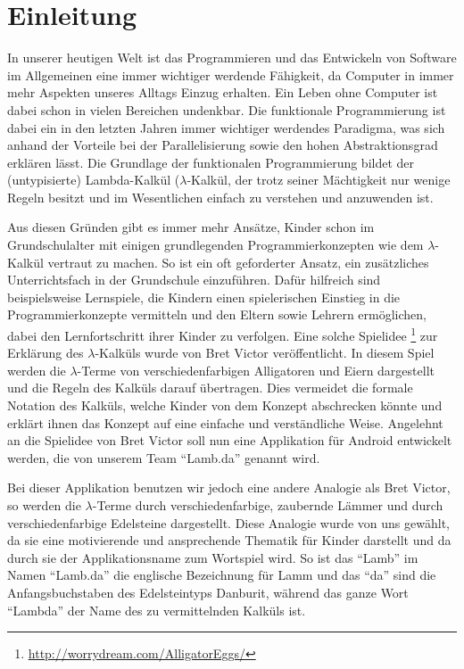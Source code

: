 \section{Einleitung}

In unserer heutigen Welt ist das Programmieren und das Entwickeln von Software im Allgemeinen eine immer wichtiger werdende Fähigkeit, da Computer in immer mehr Aspekten unseres Alltags Einzug erhalten. Ein Leben ohne Computer ist dabei schon in vielen Bereichen undenkbar. \newline 
Die funktionale Programmierung ist dabei ein in den letzten Jahren immer wichtiger werdendes Paradigma, was sich anhand der Vorteile bei der Parallelisierung sowie den hohen Abstraktionsgrad erklären lässt. Die Grundlage der funktionalen Programmierung bildet der (untypisierte) Lambda-Kalkül ($\lambda$-Kalkül, der trotz seiner Mächtigkeit nur wenige Regeln besitzt und im Wesentlichen einfach zu verstehen und anzuwenden ist.

Aus diesen Gründen gibt es immer mehr Ansätze, Kinder schon im Grundschulalter mit einigen grundlegenden Programmierkonzepten wie dem $\lambda$-Kalkül vertraut zu machen. So ist ein oft geforderter Ansatz, ein zusätzliches Unterrichtsfach in der Grundschule einzuführen. Dafür hilfreich sind beispielsweise Lernspiele, die Kindern einen spielerischen Einstieg in die Programmierkonzepte vermitteln und den Eltern sowie Lehrern ermöglichen, dabei den Lernfortschritt ihrer Kinder zu verfolgen.\newline
Eine solche Spielidee \footnote{\url{http://worrydream.com/AlligatorEggs/}} zur Erklärung des $\lambda$-Kalküls wurde von Bret Victor veröffentlicht. In diesem Spiel werden die $\lambda$-Terme von verschiedenfarbigen Alligatoren und Eiern dargestellt und die Regeln des Kalküls darauf übertragen. Dies vermeidet die formale Notation des Kalküls, welche Kinder von dem Konzept abschrecken könnte und erklärt ihnen das Konzept auf eine einfache und verständliche Weise. Angelehnt an die Spielidee von Bret Victor soll nun eine Applikation für Android entwickelt werden, die von unserem Team "`Lamb.da"' genannt wird. 

Bei dieser Applikation benutzen wir jedoch eine andere Analogie als Bret Victor, so werden die $\lambda$-Terme durch verschiedenfarbige, zaubernde Lämmer und durch verschiedenfarbige Edelsteine dargestellt. Diese Analogie wurde von uns gewählt, da sie eine motivierende und ansprechende Thematik für Kinder darstellt und da durch sie der Applikationsname zum Wortspiel wird. So ist das "`Lamb"' im Namen "`Lamb.da"' die englische Bezeichnung für Lamm und das "`da"' sind die Anfangsbuchstaben des Edelsteintyps Danburit, während das ganze Wort "`Lambda"' der Name des zu vermittelnden Kalküls ist. 


